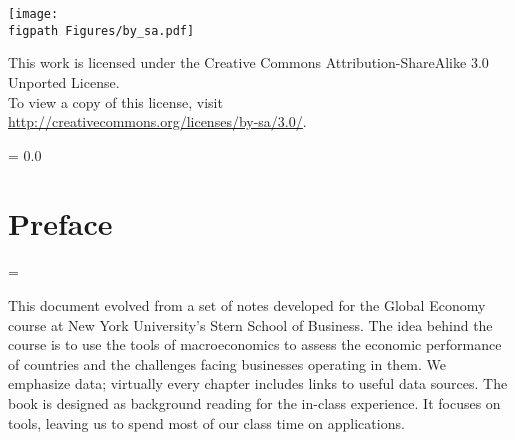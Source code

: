 \begin{titlepage}
\begin{minipage}{0.9in}
\begin{flushleft}
\vspace{0.12in}
\texttt{[image: \\figpath Figures/by\_sa.pdf]} \\
\vfill
\vspace{0.27in}
\phantom{m}
\end{flushleft}
\end{minipage}
\hspace{0.1in}
%
\begin{minipage}{0.80\textwidth}
\begin{flushleft}
 This work is licensed under the Creative Commons Attribution-ShareAlike 3.0 Unported License.\\
 \vspace{0.05in}
 To view a copy of this license, visit \\ \url{http://creativecommons.org/licenses/by-sa/3.0/}.\\
 \end{flushleft}
\end{minipage}
\end{titlepage}


\parskip = 0.0\bigskipamount
\tableofcontents

\chapter*{Preface}
\parskip = \bigskipamount

This document evolved from a set of notes developed
for the Global Economy course at New York
University's Stern School of Business.
The idea behind the course is to use the tools of macroeconomics
to assess the economic performance of countries
and the challenges facing businesses operating in them.
We emphasize data;
virtually every chapter includes links to useful data sources.
The book is designed as background reading for the in-class experience.
It focuses on tools,
leaving us to spend most of our class time on applications.

